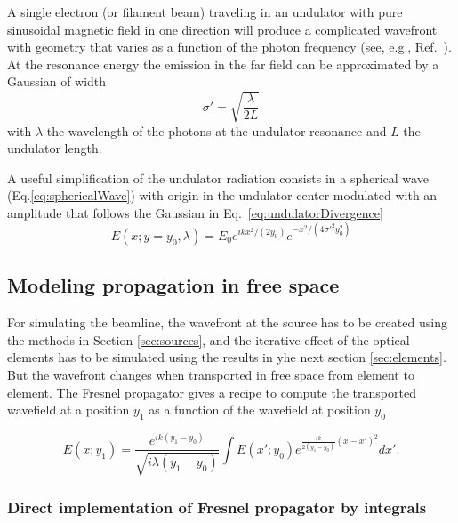 \documentclass[]{spie}  %
\begin{document}
A single electron (or filament beam) traveling in an undulator with pure sinusoidal magnetic field in one direction will produce a complicated wavefront with geometry that varies as a function of the photon frequency (see, e.g., Ref.~\cite{elleaume}). At the resonance energy the emission in the far field can be approximated by a Gaussian of width \cite{elleaume}
\begin{equation}
\label{eq:undulatorDivergence}
    \sigma' = \sqrt{\frac{\lambda}{2 L}}
\end{equation}
with $\lambda$ the wavelength of the photons at the undulator resonance and $L$ the undulator length. 

A useful simplification of the undulator radiation consists in a spherical wave (Eq.\ref{eq:sphericalWave}) with origin in the undulator center modulated with an amplitude that follows the Gaussian in Eq.~\ref{eq:undulatorDivergence}
\begin{equation}
    E(x;y=y_0,\lambda) = E_0 e^{i k x^2 / (2 y_0)} e^{-x^2/(4 \sigma'^2 y_0^2)}
\end{equation}



\subsection{Modeling propagation in free space}
\label{sec:propagation}

For simulating the beamline, the wavefront at the source has to be created using the methods in Section \ref{sec:sources}, and the iterative effect of the optical elements has to be simulated using the results in yhe next section \ref{sec:elements}. But the wavefront changes when transported in free space from element to element. The Fresnel propagator \cite{goodmanfourier} gives a recipe to compute the transported wavefield at a position $y_1$ as a function of the wavefield at position $y_0$

\begin{equation}\label{eq:fresnelPropagator}
E(x;y_1) =  \frac{e^{i k (y_1-y_0)}}{\sqrt{i \lambda (y_1-y_0)}} \int E(x';y_0) e^{ \frac{i k}{2 (y_1-y_0)}  (x-x')^2  }  dx'.
\end{equation}

\subsubsection{Direct implementation of Fresnel propagator by integrals}
\label{sec:integralPropagator}
\end{document}
